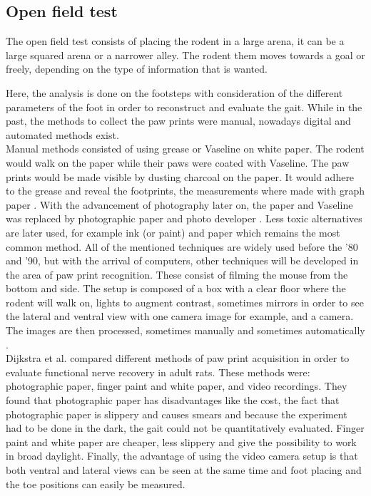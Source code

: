 \subsection{Open field test}

The open field test consists of placing the rodent in a large arena, it can be a large squared arena or a narrower alley. The rodent them moves towards a goal or freely, depending on the type of information that is wanted.

Here, the analysis is done on the footsteps with consideration of the different parameters of the foot in order to reconstruct and evaluate the gait. While in the past, the methods to collect the paw prints were manual, nowadays digital and automated methods exist.\cite{agatha}\\

Manual methods consisted of using grease or Vaseline on white paper. The rodent would walk on the paper while their paws were coated with Vaseline. The paw prints would be made visible by dusting charcoal on the paper. It would adhere to the grease and reveal the footprints, the measurements where made with graph paper \cite{vaseline}. With the advancement of photography later on, the paper and Vaseline was replaced by photographic paper and photo developer \cite{photographicpaper}. Less toxic alternatives are later used, for example ink (or paint) and paper which remains the most common method. All of the mentioned techniques are widely used before the '80 and '90, but with the arrival of computers, other techniques will be developed in the area of paw print recognition. These consist of filming the mouse from the bottom and side. The setup is composed of a box with a clear floor where the rodent will walk on, lights to augment contrast, sometimes mirrors in order to see the lateral and ventral view with one camera image for example, and a camera. The images are then processed, sometimes manually and sometimes automatically \cite{agatha}.\\

Dijkstra et al. \cite{dijkstra} compared different methods of paw print acquisition in order to evaluate functional nerve recovery in adult rats. These methods were: photographic paper, finger paint and white paper, and video recordings. They found that photographic paper has disadvantages like the cost, the fact that photographic paper is slippery and causes smears and because the experiment had to be done in the dark, the gait could not be quantitatively evaluated. Finger paint and white paper are cheaper, less slippery and give the possibility to work in broad daylight. Finally, the advantage of using the video camera setup is that both ventral and lateral views can be seen at the same time and foot placing and the toe positions can easily be measured.\\

